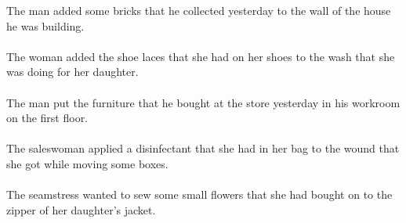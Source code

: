 The man added some bricks that he collected yesterday to the wall of the house he was building.	\\	\\
The woman added the shoe laces that she had on her shoes to the wash that she was doing for her daughter.	\\	\\
The man put the furniture that he bought at the store yesterday in his workroom on the first floor.	\\	\\
The saleswoman applied a disinfectant that she had in her bag to the wound that she got while moving some boxes.	\\	\\
The seamstress wanted to sew some small flowers that she had bought on to the zipper of her daughter's jacket.	\\	\\

